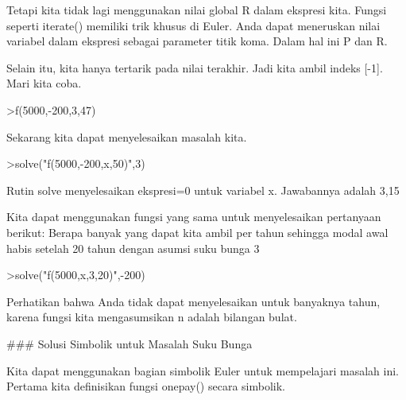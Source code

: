 \documentclass[a4paper,10pt]{article}
\begin{document}
\begin{eulernotebook}
\begin{euleroutput}
  Tetapi kita tidak lagi menggunakan nilai global R dalam ekspresi kita. Fungsi seperti iterate() memiliki trik khusus di Euler. Anda dapat meneruskan nilai variabel dalam ekspresi sebagai parameter titik koma. Dalam hal ini P dan R.
  
  Selain itu, kita hanya tertarik pada nilai terakhir. Jadi kita ambil indeks [-1]. Mari kita coba.
  
\end{euleroutput}
\begin{eulerprompt}
>f(5000,-200,3,47)
\end{eulerprompt}
\begin{euleroutput}
  
  Sekarang kita dapat menyelesaikan masalah kita.
  
\end{euleroutput}
\begin{eulerprompt}
>solve("f(5000,-200,x,50)",3)
\end{eulerprompt}
\begin{euleroutput}
  
  Rutin solve menyelesaikan ekspresi=0 untuk variabel x. Jawabannya adalah 3,15%
  
  Kita dapat menggunakan fungsi yang sama untuk menyelesaikan pertanyaan berikut: Berapa banyak yang dapat kita ambil per tahun sehingga modal awal habis setelah 20 tahun dengan asumsi suku bunga 3%
  
\end{euleroutput}
\begin{eulerprompt}
>solve("f(5000,x,3,20)",-200)
\end{eulerprompt}
\begin{euleroutput}
  
  Perhatikan bahwa Anda tidak dapat menyelesaikan untuk banyaknya tahun, karena fungsi kita mengasumsikan n adalah bilangan bulat.
  
  ### Solusi Simbolik untuk Masalah Suku Bunga
  
  Kita dapat menggunakan bagian simbolik Euler untuk mempelajari masalah ini. Pertama kita definisikan fungsi onepay() secara simbolik.
  
\end{euleroutput}
\begin{euleroutput}
  

\end{euleroutput}
\end{eulernotebook}
\end{document}

